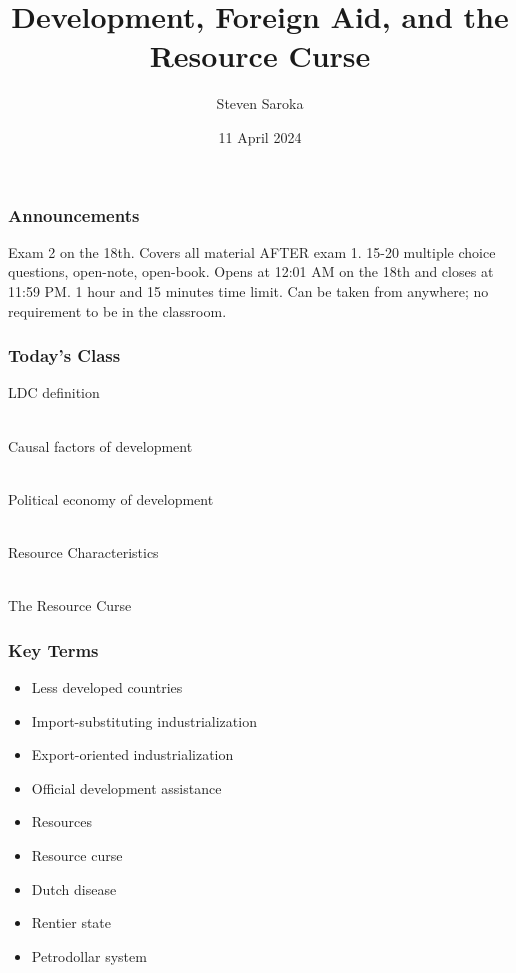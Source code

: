\documentclass[handout]{beamer}
\title[Development and Foreign Aid]{\LARGE{Development, Foreign Aid, and the Resource Curse}}
\author[POLI 150]{Steven Saroka}
\institute{POLI 150}
\date{11 April 2024}
\begin{document}
\begin{frame}
\titlepage %
\end{frame}



\begin{frame} 
	\frametitle{\LARGE{Announcements}}
	\begin{itemize}
		\Large{
			\item Exam 2 on the 18th. Covers all material AFTER exam 1. 15-20 multiple choice questions, open-note, open-book. Opens at 12:01 AM on the 18th and closes at 11:59 PM. 1 hour and 15 minutes time limit. Can be taken from anywhere; no requirement to be in the classroom.
			
		}
	\end{itemize}
\end{frame}

\begin{frame} 
	\frametitle{\LARGE{Today's Class}}
	\begin{itemize}
		\Large{
			\item LDC definition
			\\~\\
			\item Causal factors of development
			\\~\\
			\item Political economy of development
			\\~\\
			\item Resource Characteristics 
			\\~\\ 
			\item The Resource Curse   
		}
	\end{itemize}
\end{frame}

\begin{frame} 
	\frametitle{\LARGE{Key Terms}}
	\begin{itemize}
		\item Less developed countries
		\item Import-substituting industrialization
		\item Export-oriented industrialization 
		\item Official development assistance
		\item Resources
		\item Resource curse
		\item Dutch disease
		\item Rentier state
		\item Petrodollar system
	\end{itemize}
\end{frame}
\end{document}
